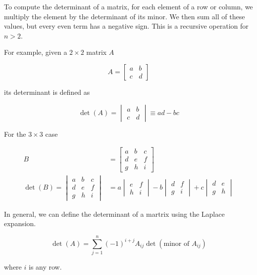 \documentclass[a4paper]{article}
\begin{document}
To compute the determinant of a matrix, for each element of a row or column, we multiply the element by the determinant of its minor.
We then sum all of these values, but every even term has a negative sign.
This is a recursive operation for \(n > 2\).

For example, given a \(2 \times 2\) matrix \(A\)

\[
    A=
    \begin{bmatrix}
        a & b \\
        c & d
    \end{bmatrix}
\]

its determinant is defined as

\[
    \det(A)=
    \begin{vmatrix}
        a & b \\
        c & d
    \end{vmatrix}
    \equiv ad-bc
\]

For the \(3 \times 3\) case

\begin{align*}
    B&=
    \begin{bmatrix}
        a & b & c \\
        d & e & f \\
        g & h & i
    \end{bmatrix}
    \\
    \det(B)=
    \begin{vmatrix}
        a & b & c \\
        d & e & f \\
        g & h & i
    \end{vmatrix}
    &=
    a \begin{vmatrix}
        e & f \\
        h & i
    \end{vmatrix}
    -b \begin{vmatrix}
        d & f \\
        g & i
    \end{vmatrix}
    +c \begin{vmatrix}
        d & e \\
        g & h
    \end{vmatrix}
\end{align*}

In general, we can define the determinant of a martrix using the Laplace expansion.

\[
    \det(A)=\sum_{j=1}^{n}{(-1)}^{i+j}A_{ij}\det(\text{minor of }A_{ij})
\]

where \(i\) is any row.
\end{document}
